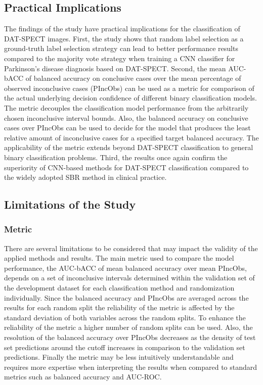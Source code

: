 \subsection{Practical Implications}

The findings of the study have practical implications for the classification of DAT-SPECT images.
First, the study shows that random label selection as a ground-truth label selection strategy 
can lead to better performance results compared to the majority vote strategy 
when training a CNN classifier for Parkinson's disease diagnosis based on DAT-SPECT.
Second, the mean AUC-bACC of balanced accuracy on conclusive cases over the mean percentage of observed inconclusive cases (PIncObs)
can be used as a metric for comparison of the actual underlying decision confidence of 
different binary classification models.
The metric decouples the classification model performance from the arbitrarily chosen inconclusive interval bounds.
Also, the balanced accuracy on conclusive cases over PIncObs can be used to decide for the model that 
produces the least relative amount of inconclusive cases for a specified target balanced accuracy.
The applicability of the metric extends beyond DAT-SPECT classification to general binary classification problems.
Third, the results once again confirm the superiority of CNN-based methods for DAT-SPECT classification compared to the
widely adopted SBR method in clinical practice.


\subsection{Limitations of the Study}

\subsubsection{Metric}

There are several limitations to be considered that may impact the validity of the applied methods and results.
The main metric used to compare the model performance, the AUC-bACC of mean balanced accuracy over mean PIncObs, 
depends on a set of inconclusive intervals determined within the validation set of the development dataset 
for each classification method and randomization individually.
Since the balanced accuracy and PIncObs are averaged across the results for each random split 
the reliability of the metric is affected by the standard deviation of both variables across the random splits.
To enhance the reliability of the metric a higher number of random splits can be used.
Also, the resolution of the balanced accuracy over PIncObs decreases as the density of test set 
predictions around the cutoff increases in comparison to the validation set predictions.
Finally the metric may be less intuitively understandable and requires more expertise when interpreting the results
when compared to standard metrics such as balanced accuracy and AUC-ROC.


